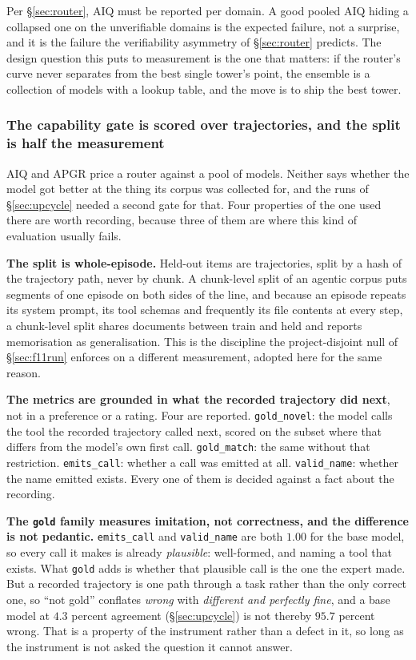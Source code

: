 \documentclass[11pt]{article}
\begin{document}
Per \S\ref{sec:router}, AIQ must be reported per domain. A good pooled AIQ hiding a collapsed one on the unverifiable domains is the expected failure, not a surprise, and it is the failure the verifiability asymmetry of \S\ref{sec:router} predicts. The design question this puts to measurement is the one that matters: if the router's curve never separates from the best single tower's point, the ensemble is a collection of models with a lookup table, and the move is to ship the best tower.

\subsubsection*{The capability gate is scored over trajectories, and the split is half the measurement}

AIQ and APGR price a router against a pool of models. Neither says whether the model got better at the thing its corpus was collected for, and the runs of \S\ref{sec:upcycle} needed a second gate for that. Four properties of the one used there are worth recording, because three of them are where this kind of evaluation usually fails.

\textbf{The split is whole-episode.} Held-out items are trajectories, split by a hash of the trajectory path, never by chunk. A chunk-level split of an agentic corpus puts segments of one episode on both sides of the line, and because an episode repeats its system prompt, its tool schemas and frequently its file contents at every step, a chunk-level split shares documents between train and held and reports memorisation as generalisation. This is the discipline the project-disjoint null of \S\ref{sec:f11run} enforces on a different measurement, adopted here for the same reason.

\textbf{The metrics are grounded in what the recorded trajectory did next}, not in a preference or a rating. Four are reported. \texttt{gold\_novel}: the model calls the tool the recorded trajectory called next, scored on the subset where that differs from the model's own first call. \texttt{gold\_match}: the same without that restriction. \texttt{emits\_call}: whether a call was emitted at all. \texttt{valid\_name}: whether the name emitted exists. Every one of them is decided against a fact about the recording.

\textbf{The \texttt{gold} family measures imitation, not correctness, and the difference is not pedantic.} \texttt{emits\_call} and \texttt{valid\_name} are both $1.00$ for the base model, so every call it makes is already \emph{plausible}: well-formed, and naming a tool that exists. What \texttt{gold} adds is whether that plausible call is the one the expert made. But a recorded trajectory is one path through a task rather than the only correct one, so ``not gold'' conflates \emph{wrong} with \emph{different and perfectly fine}, and a base model at $4.3$ percent agreement (\S\ref{sec:upcycle}) is not thereby $95.7$ percent wrong. That is a property of the instrument rather than a defect in it, so long as the instrument is not asked the question it cannot answer.
\end{document}
